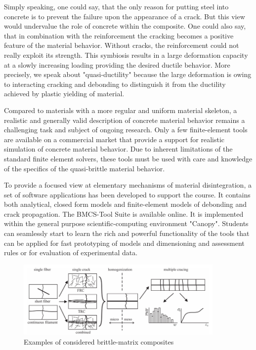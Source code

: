 \documentclass[main.tex]{subfiles}
\begin{document}
Simply speaking, one could say, that the only reason for putting steel into concrete
is to prevent the failure upon the appearance of a crack. But this view would undervalue
the role of concrete within the composite. One could also say, that in combination 
with the reinforcement the cracking becomes a positive feature of the material behavior.
Without cracks, the reinforcement could not really exploit its strength. This symbiosis 
results in a large deformation capacity at a slowly increasing loading providing the desired 
ductile behavior. More precisely, we speak about "quasi-ductility" because the large deformation 
is owing to interacting cracking and debonding to distinguish
it from the ductility achieved by plastic yielding of material.

Compared to materials with a more regular and uniform material 
skeleton, a realistic and generally valid description of concrete material behavior 
remains a challenging task and subject of ongoing research. 
Only a few finite-element tools are available on a commercial market that 
provide a support for realistic simulation of concrete material behavior.
Due to inherent limitations of the standard finite element solvers, these
tools must be used with care and knowledge of the specifics of 
the quasi-brittle material behavior. 

To provide a focused view at elementary
mechanisms of material disintegration, a  
set of software applications has been developed 
to support the course. It contains both analytical, closed form
models and finite-element models of debonding and crack propagation.
The BMCS-Tool Suite is available online. It is implemented within the 
general purpose scientific-computing environment "Canopy".
Students can seamlessly start to learn the rich and powerful 
functionality of the tools that can be applied for fast prototyping
of models and dimensioning and assessment rules or for evaluation of experimental data.

\begin{figure}
\centering
  \includegraphics[width=0.9\textwidth]{fig/Lecture01/composite_types.png}
	\caption{Examples of considered brittle-matrix composites}
	\label{fig:composite_types}
\end{figure}
\end{document}

